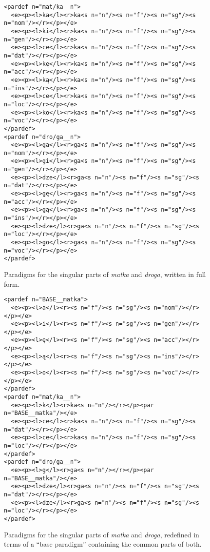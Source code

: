 \documentclass[11pt]{article}
\begin{document}
\begin{figure*}
\begin{small}
\begin{verbatim}
<pardef n="mat/ka__n">
  <e><p><l>ka</l><r>ka<s n="n"/><s n="f"/><s n="sg"/><s n="nom"/></r></p></e>
  <e><p><l>ki</l><r>ka<s n="n"/><s n="f"/><s n="sg"/><s n="gen"/></r></p></e>
  <e><p><l>ce</l><r>ka<s n="n"/><s n="f"/><s n="sg"/><s n="dat"/></r></p></e>
  <e><p><l>kę</l><r>ka<s n="n"/><s n="f"/><s n="sg"/><s n="acc"/></r></p></e>
  <e><p><l>ką</l><r>ka<s n="n"/><s n="f"/><s n="sg"/><s n="ins"/></r></p></e>
  <e><p><l>ce</l><r>ka<s n="n"/><s n="f"/><s n="sg"/><s n="loc"/></r></p></e>
  <e><p><l>ko</l><r>ka<s n="n"/><s n="f"/><s n="sg"/><s n="voc"/></r></p></e>
</pardef>
<pardef n="dro/ga__n">
  <e><p><l>ga</l><r>ga<s n="n"/><s n="f"/><s n="sg"/><s n="nom"/></r></p></e>
  <e><p><l>gi</l><r>ga<s n="n"/><s n="f"/><s n="sg"/><s n="gen"/></r></p></e>
  <e><p><l>dze</l><r>ga<s n="n"/><s n="f"/><s n="sg"/><s n="dat"/></r></p></e>
  <e><p><l>gę</l><r>ga<s n="n"/><s n="f"/><s n="sg"/><s n="acc"/></r></p></e>
  <e><p><l>gą</l><r>ga<s n="n"/><s n="f"/><s n="sg"/><s n="ins"/></r></p></e>
  <e><p><l>dze</l><r>ga<s n="n"/><s n="f"/><s n="sg"/><s n="loc"/></r></p></e>
  <e><p><l>go</l><r>ga<s n="n"/><s n="f"/><s n="sg"/><s n="voc"/></r></p></e>
</pardef>
\end{verbatim}
\end{small}
\caption{Paradigms for the singular parts of 
\emph{matka} and \emph{droga}, written in full form.
\label{fig:pardefs}}
\end{figure*}
\begin{figure*}
\begin{small}
\begin{verbatim}
<pardef n="BASE__matka">
  <e><p><l>a</l><r><s n="f"/><s n="sg"/><s n="nom"/></r></p></e>
  <e><p><l>i</l><r><s n="f"/><s n="sg"/><s n="gen"/></r></p></e>
  <e><p><l>ę</l><r><s n="f"/><s n="sg"/><s n="acc"/></r></p></e>
  <e><p><l>ą</l><r><s n="f"/><s n="sg"/><s n="ins"/></r></p></e>
  <e><p><l>o</l><r><s n="f"/><s n="sg"/><s n="voc"/></r></p></e>
</pardef>
<pardef n="mat/ka__n">
  <e><p><l>k</l><r>ka<s n="n"/></r></p><par n="BASE__matka"/></e>
  <e><p><l>ce</l><r>ka<s n="n"/><s n="f"/><s n="sg"/><s n="dat"/></r></p></e>
  <e><p><l>ce</l><r>ka<s n="n"/><s n="f"/><s n="sg"/><s n="loc"/></r></p></e>
</pardef>
<pardef n="dro/ga__n">
  <e><p><l>g</l><r>ga<s n="n"/></r></p><par n="BASE__matka"/></e>
  <e><p><l>dze</l><r>ga<s n="n"/><s n="f"/><s n="sg"/><s n="dat"/></r></p></e>
  <e><p><l>dze</l><r>ga<s n="n"/><s n="f"/><s n="sg"/><s n="loc"/></r></p></e>
</pardef>
\end{verbatim}
\end{small}
\caption{Paradigms for the singular parts of \emph{matka} and \emph{droga}, redefined in terms of 
a ``base paradigm'' containing the common parts of both.
\label{fig:basepardefs}}
\end{figure*}
\end{document}
